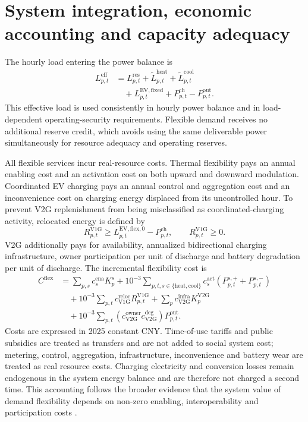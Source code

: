 \documentclass[12pt]{article}
\begin{document}
\section{System integration, economic accounting and capacity adequacy}

The hourly load entering the power balance is
\begin{align}
  L^{\mathrm{eff}}_{p,t}
  &=
  L^{\mathrm{res}}_{p,t}
  +\widetilde L^{\mathrm{heat}}_{p,t}
  +\widetilde L^{\mathrm{cool}}_{p,t} \nonumber\\
  &\quad
  +L^{\mathrm{EV,fixed}}_{p,t}
  +P^{\mathrm{ch}}_{p,t}
  -P^{\mathrm{out}}_{p,t}.
  \label{eq:effectiveload}
\end{align}
This effective load is used consistently in hourly power balance and in
load-dependent operating-security requirements. Flexible demand receives no
additional reserve credit, which avoids using the same deliverable power
simultaneously for resource adequacy and operating reserves.

All flexible services incur real-resource costs. Thermal flexibility pays an
annual enabling cost and an activation cost on both upward and downward
modulation. Coordinated EV charging pays an annual control and aggregation
cost and an inconvenience cost on charging energy displaced from its
uncontrolled hour. To prevent V2G replenishment from being misclassified as
coordinated-charging activity, relocated energy is defined by
\begin{equation}
  R^{\mathrm{V1G}}_{p,t}
  \ge
  L^{\mathrm{EV,flex},0}_{p,t}-P^{\mathrm{ch}}_{p,t},
  \qquad
  R^{\mathrm{V1G}}_{p,t}\ge0.
  \label{eq:relocation}
\end{equation}
V2G additionally pays for availability, annualized bidirectional charging
infrastructure, owner participation per unit of discharge and battery
degradation per unit of discharge. The incremental flexibility cost is
\begin{align}
 C^{\mathrm{flex}}
 &=
 \sum_{p,s}c^{\mathrm{ena}}_s K^s_p
 +10^{-3}\sum_{p,t,s\in\{\mathrm{heat},\mathrm{cool}\}}
 c^{\mathrm{act}}_s
 \left(P^{s,+}_{p,t}+P^{s,-}_{p,t}\right) \nonumber\\
 &\quad
 +10^{-3}\sum_{p,t}c^{\mathrm{reloc}}_{\mathrm{V1G}}
 R^{\mathrm{V1G}}_{p,t}
 +\sum_p c^{\mathrm{infra}}_{\mathrm{V2G}}
 K^{\mathrm{V2G}}_p \nonumber\\
 &\quad
 +10^{-3}\sum_{p,t}
 \left(c^{\mathrm{owner}}_{\mathrm{V2G}}
 c^{\mathrm{deg}}_{\mathrm{V2G}}\right)
 P^{\mathrm{out}}_{p,t}.
  \label{eq:flexcost}
\end{align}
Costs are expressed in 2025 constant CNY. Time-of-use tariffs and public
subsidies are treated as transfers and are not added to social system cost;
metering, control, aggregation, infrastructure, inconvenience and battery
wear are treated as real resource costs. Charging electricity and conversion
losses remain endogenous in the system energy balance and are therefore not
charged a second time. This accounting follows the broader evidence that the
system value of demand flexibility depends on non-zero enabling,
interoperability and participation costs
\cite{IEADemandFlex2025,Wan2026V2G,Sagaria2025V2G}.
\end{document}
